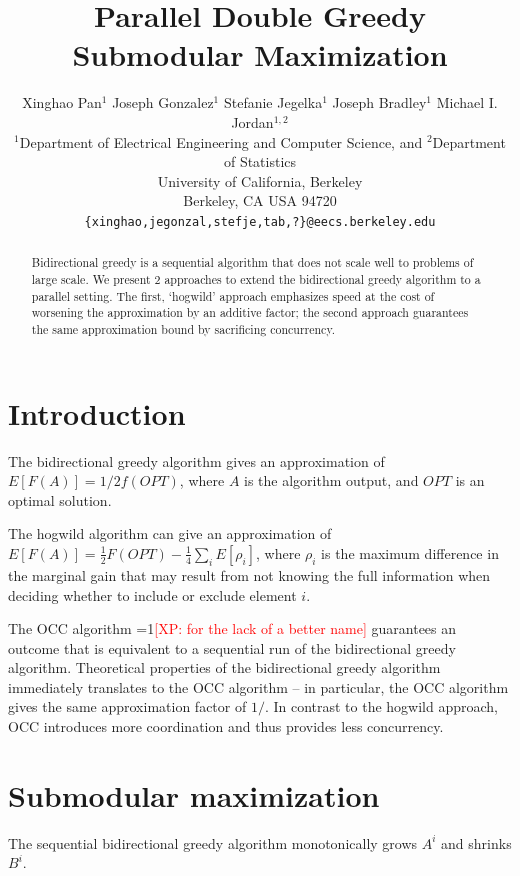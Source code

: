\documentclass{article} %
\title{Parallel Double Greedy Submodular Maximization}
\author{
Xinghao Pan$^1$ Joseph Gonzalez$^1$ Stefanie Jegelka$^1$ Joseph Bradley$^{1}$ Michael I. Jordan$^{1,2}$\\
$^1$Department of Electrical Engineering and Computer Science, and $^2$Department of Statistics\\
University of California, Berkeley\\
Berkeley, CA USA 94720\\
  \texttt{\{xinghao,jegonzal,stefje,tab,?\}@eecs.berkeley.edu} \\
}
\newcommand{\Comments}{1}
\newcommand{\note}[2]{\ifnum\Comments=1\textcolor{#1}{#2}\fi}
\newcommand{\taunghao}[1]{\note{red}{[XP: #1]}}
\begin{document}
\maketitle


\begin{abstract}
Bidirectional greedy is a sequential algorithm that does not scale well to problems of large scale.
We present 2 approaches to extend the bidirectional greedy algorithm to a parallel setting.
The first, `hogwild' approach emphasizes speed at the cost of worsening the approximation by an additive factor;
the second approach guarantees the same approximation bound by sacrificing concurrency.
\end{abstract}

\section{Introduction}
The bidirectional greedy algorithm \cite{buchbinder2012} gives an approximation of $E[F(A)] = 1/2 f(OPT)$, where $A$ is the algorithm output, and $OPT$ is an optimal solution.

The hogwild algorithm can give an approximation of $E[F(A)] = \frac{1}{2} F(OPT) - \frac{1}{4}\sum_iE[\rho_i]$, where $\rho_i$ is the maximum difference in the marginal gain that may result from not knowing the full information when deciding whether to include or exclude element $i$.

The OCC algorithm \taunghao{for the lack of a better name} guarantees an outcome that is equivalent to a sequential run of the bidirectional greedy algorithm.
Theoretical properties of the bidirectional greedy algorithm immediately translates to the OCC algorithm -- in particular, the OCC algorithm gives the same approximation factor of $1/$.
In contrast to the hogwild approach, OCC introduces more coordination and thus provides less concurrency.











\section{Submodular maximization}

The sequential bidirectional greedy \cite{buchbinder2012} algorithm monotonically grows $A^i$ and shrinks $B^i$.
\end{document}
